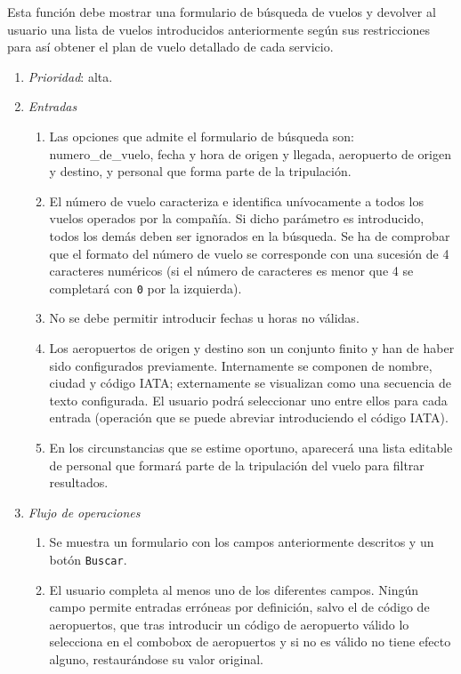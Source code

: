 	Esta función debe mostrar una formulario de búsqueda de vuelos y devolver al usuario una lista de vuelos introducidos anteriormente según sus restricciones para así obtener el plan de vuelo detallado de cada servicio.

\begin{enumerate}
	\item \textit{Prioridad}: alta.
	\item \textit{Entradas}
	\begin{enumerate}
		\item Las opciones que admite el formulario de búsqueda son: \gls{numero_de_vuelo}, fecha y hora de origen y llegada, aeropuerto de origen y destino, y personal que forma parte de la tripulación.
		\item El número de vuelo caracteriza e identifica unívocamente a todos los vuelos operados por la compañía. Si dicho parámetro es introducido, todos los demás deben ser ignorados en la búsqueda. Se ha de comprobar que el formato del número de vuelo se corresponde con una sucesión de 4 caracteres numéricos (si el número de caracteres es menor que 4 se completará con \verb|0| por la izquierda).
		\item No se debe permitir introducir fechas u horas no válidas.
		\item Los aeropuertos de origen y destino son un conjunto finito y han de haber sido configurados previamente. Internamente se componen de nombre, ciudad y código \gls{IATA}; externamente se visualizan como una secuencia de texto configurada. El usuario podrá seleccionar uno entre ellos para cada entrada (operación que se puede abreviar introduciendo el código IATA).
		\item En los circunstancias que se estime oportuno, aparecerá una lista editable de personal que formará parte de la tripulación del vuelo para filtrar resultados.
	\end{enumerate}
	\item \textit{Flujo de operaciones}
	\begin{enumerate}
		\item Se muestra un formulario con los campos anteriormente descritos y un botón \verb|Buscar|.
		\item El usuario completa al menos uno de los diferentes campos. Ningún campo permite entradas erróneas por definición, salvo el de código de aeropuertos, que tras introducir un código de aeropuerto válido lo selecciona en el \gls{combobox} de aeropuertos y si no es válido no tiene efecto alguno, restaurándose su valor original.

\end{enumerate}
\end{enumerate}
